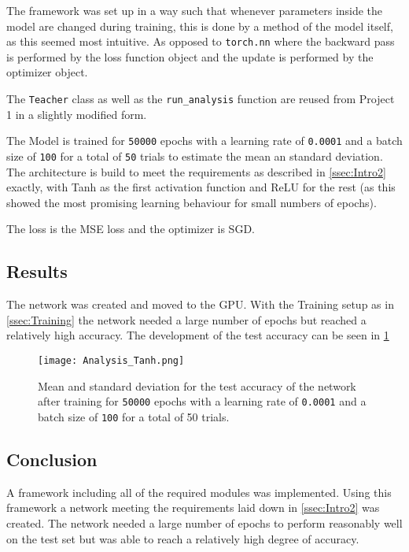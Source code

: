 \documentclass[11pt,english]{article}
\begin{document}
	The framework was set up in a way such that whenever parameters inside the model are changed during training, this is done by a method of the model itself, as this seemed most intuitive. As opposed to \lstinline|torch.nn| where the backward pass is performed by the loss function object and the update is performed by the optimizer object.
	
	The \lstinline|Teacher| class as well as the \lstinline|run_analysis| function are reused from Project 1 in a slightly modified form.
	
	The Model is trained for \lstinline|50000| epochs with a learning rate of \lstinline|0.0001| and a batch size of \lstinline|100| for a total of \lstinline|50| trials to estimate the mean an standard deviation. The architecture is build to meet the requirements as described in \cref{ssec:Intro2} exactly, with Tanh as the first activation function and ReLU for the rest (as this showed the most promising learning behaviour for small numbers of epochs).
	
	The loss is the MSE loss and the optimizer is SGD.
	
	\subsection{Results}
	
	The network was created and moved to the GPU. With the Training setup as in \cref{ssec:Training} the network needed a large number of epochs but reached a relatively high accuracy. The development of the test accuracy can be seen in \cref{fig:analysis_tanh}
	\vspace{-9pt}
	\begin{figure}[H]
		\centering
		\texttt{[image: Analysis\_Tanh.png]}
		\caption{Mean and standard deviation for the test accuracy of the network after training for \lstinline|50000| epochs with a learning rate of \lstinline|0.0001| and a batch size of \lstinline|100| for a total of 50 trials.}
		\label{fig:analysis_tanh}
	\end{figure} 
	
	\subsection{Conclusion}
	A framework including all of the required modules was implemented. Using this framework a network meeting the requirements laid down in \cref{ssec:Intro2} was created. The network needed a large number of epochs to perform reasonably well on the test set but was able to reach a relatively high degree of accuracy.
	
	
	\printbibliography
\end{document}
